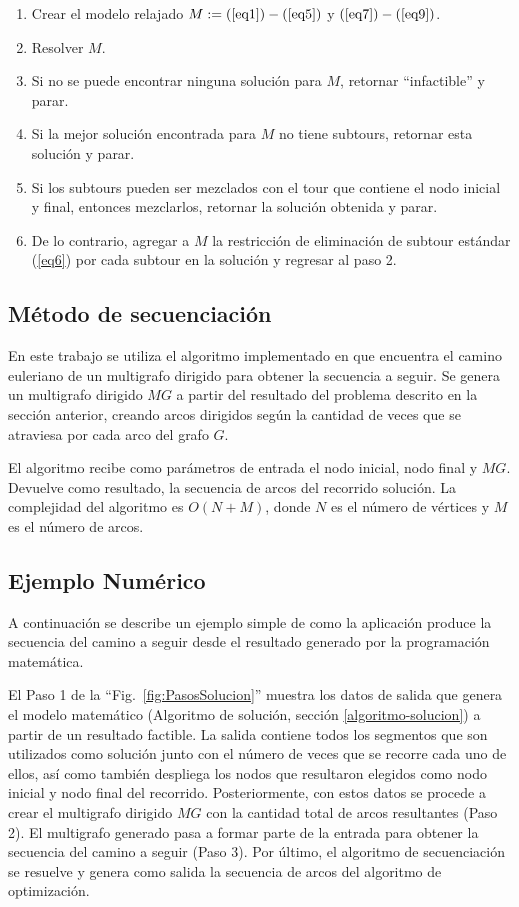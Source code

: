 \documentclass[conference,compsoc]{IEEEtran}
\begin{document}
\begin{enumerate}
\item Crear el modelo relajado $M: = (\ref{eq1}) - (\ref{eq5})$ y $(\ref{eq7}) - (\ref{eq9})$.
\item Resolver $M$.
\item Si no se puede encontrar ninguna solución para $M$, retornar ``infactible'' y parar.
\item Si la mejor solución encontrada para $M$ no tiene subtours, retornar esta solución y parar.
\item Si los subtours pueden ser mezclados con el tour que contiene el nodo inicial y final, entonces mezclarlos, retornar la solución obtenida y parar.
\item De lo contrario, agregar a $M$ la restricción de eliminación de subtour estándar (\ref{eq6}) por cada subtour en la solución y regresar al paso 2.
\end{enumerate}

\subsection{Método de secuenciación}

En este trabajo se utiliza el algoritmo implementado en \cite{RiveraHazim2015APath} que encuentra el camino euleriano de un multigrafo dirigido para obtener la secuencia a seguir. Se genera un multigrafo dirigido $MG$ a partir del resultado del problema descrito en la sección anterior, creando arcos dirigidos según la cantidad de veces que se atraviesa por cada arco del grafo $G$. 

El algoritmo recibe como parámetros de entrada el nodo inicial, nodo final y $MG$. Devuelve como resultado, la secuencia de arcos del recorrido solución. La complejidad del algoritmo es $O(N + M)$, donde $N$ es el número de vértices y $M$ es el número de arcos.

\subsection{Ejemplo Numérico}
A continuación se describe un ejemplo simple de como la aplicación produce la secuencia del camino a seguir desde el resultado generado por la programación matemática.

El Paso 1 de la ``Fig.~\ref{fig:PasosSolucion}'' muestra los datos de salida que genera el modelo matemático (Algoritmo  de  solución, sección \ref{algoritmo-solucion}) a partir de un resultado factible. La salida contiene todos los segmentos que son utilizados como solución junto con el número de veces que se recorre cada uno de ellos, así como también despliega los nodos que resultaron elegidos como nodo inicial y nodo final del recorrido. Posteriormente, con estos datos se procede a crear el multigrafo dirigido $MG$ con la cantidad total de arcos resultantes (Paso 2). El multigrafo generado pasa a formar parte de la entrada para obtener la secuencia del camino a seguir (Paso 3). Por último, el algoritmo de secuenciación se resuelve y genera como salida la secuencia de arcos del algoritmo de optimización.
\end{document}
